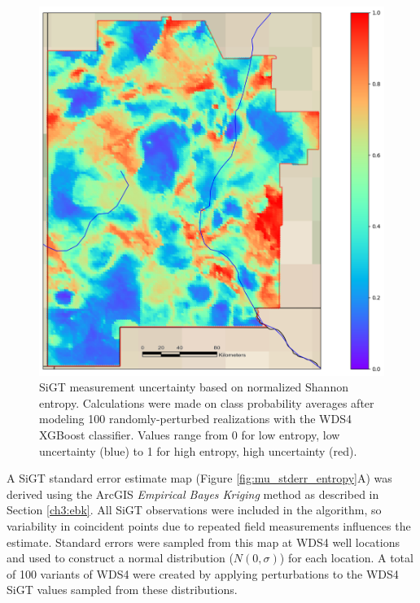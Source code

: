 \begin{figure}%
\centering
\includegraphics[width=.75\textwidth]{templates/images/Figure-MU_Entropy_Map.png}
\caption[SiGT measurement uncertainty map]
{SiGT measurement uncertainty based on normalized Shannon entropy. Calculations were made on class probability averages after modeling 100 randomly-perturbed realizations with the WDS4 XGBoost classifier. Values range from 0 for low entropy, low uncertainty (blue) to 1 for high entropy, high uncertainty (red).}
\label{fig:mu_entropy_map}
\end{figure}

A SiGT standard error estimate map (Figure \ref{fig:mu_stderr_entropy}A) was derived using the ArcGIS \textit{Empirical Bayes Kriging} method as described in Section \ref{ch3:ebk}. All SiGT observations were included in the algorithm, so variability in coincident points due to repeated field measurements influences the estimate. Standard errors were sampled from this map at WDS4 well locations and used to construct a normal distribution ($N(0,\sigma)$) for each location. A total of 100 variants of WDS4 were created by applying perturbations to the WDS4 SiGT values sampled from these distributions. 

